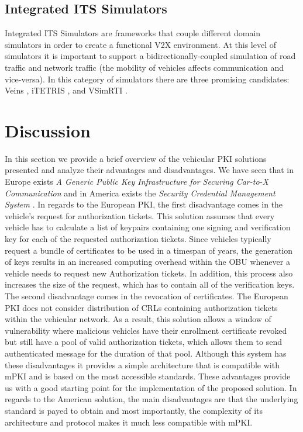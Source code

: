 \subsection{Integrated ITS Simulators}
Integrated ITS Simulators are frameworks that couple different domain simulators in order to create a functional V2X environment. At this level of simulators it is important to support a bidirectionally-coupled simulation \cite{bidirectional} of road traffic and network traffic (the mobility of vehicles affects communication and vice-versa). In this category of simulators there are three promising candidates: Veins \cite{bidirectional}, iTETRIS \cite{iTetris}, and VSimRTI \cite{vsimrti}.


\section{Discussion}
In this section we provide a brief overview of the vehicular PKI solutions presented and analyze their advantages and disadvantages.
We have seen that in Europe exists \textit{A Generic Public Key Infrastructure for Securing Car-to-X Communication} \cite{generic_eu} and in America exists the \textit{Security Credential Management System} \cite{scms}. In regards to the European PKI, the first disadvantage comes in the vehicle's request for authorization tickets. This solution assumes that every vehicle has to calculate a list of keypairs containing one signing and verification key for each of the requested authorization tickets. Since vehicles typically request a bundle of certificates to be used in a timespan of years, the generation of keys results in an increased computing overhead within the OBU whenever a vehicle needs to request new Authorization tickets. In addition, this process also increases the size of the request, which has to contain all of the verification keys. The second disadvantage comes in the revocation of certificates. The European PKI does not consider distribution of CRLs containing authorization tickets within the vehicular network. As a result, this solution allows a window of vulnerability where malicious vehicles have their enrollment certificate revoked but still have a pool of valid authorization tickets, which allows them to send authenticated message for the duration of that pool. Although this system has these disadvantages it provides a simple architecture that is compatible with mPKI and is based on the most accessible standards. These advantages provide us with a good starting point for the implementation of the proposed solution. In regards to the American solution, the main disadvantages are that the underlying standard is payed to obtain and most importantly, the complexity of its architecture and protocol makes it much less compatible with mPKI. 

